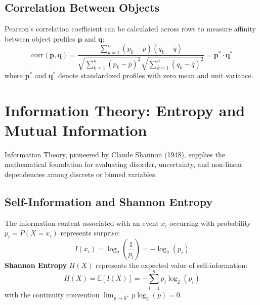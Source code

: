 \subsection{Correlation Between Objects}
Pearson's correlation coefficient can be calculated across rows to measure affinity between object profiles $\mathbf{p}$ and $\mathbf{q}$:
\begin{equation}
    \text{corr}(\mathbf{p}, \mathbf{q}) = \frac{\sum_{k=1}^n (p_k - \bar{p})(q_k - \bar{q})}{\sqrt{\sum_{k=1}^n (p_k - \bar{p})^2} \sqrt{\sum_{k=1}^n (q_k - \bar{q})^2}} = \mathbf{p}^* \cdot \mathbf{q}^*
\end{equation}
where $\mathbf{p}^*$ and $\mathbf{q}^*$ denote standardized profiles with zero mean and unit variance.

\section{Information Theory: Entropy and Mutual Information}
\label{sec:dm-information-theory}

Information Theory, pioneered by Claude Shannon (1948), supplies the mathematical foundation for evaluating disorder, uncertainty, and non-linear dependencies among discrete or binned variables.

\subsection{Self-Information and Shannon Entropy}
The information content associated with an event $x_i$ occurring with probability $p_i = P(X = x_i)$ represents surprise:
\begin{equation}
    I(x_i) = \log_2\left(\frac{1}{p_i}\right) = -\log_2(p_i)
\end{equation}
\textbf{Shannon Entropy} $H(X)$ represents the expected value of self-information:
\begin{equation}
    H(X) = \mathbb{E}[I(X)] = -\sum_{i=1}^n p_i \log_2(p_i)
\end{equation}
with the continuity convention $\lim_{p \to 0^+} p \log_2(p) = 0$.

